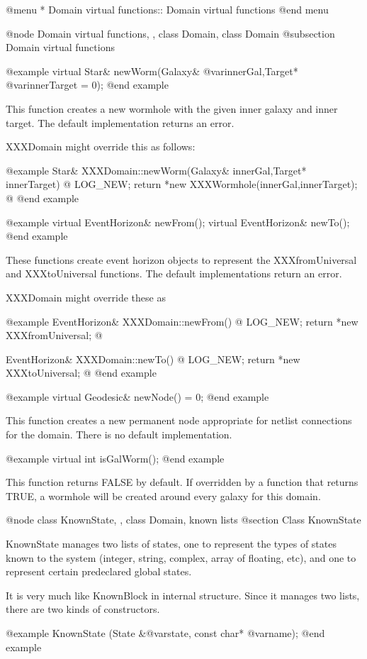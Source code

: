 @menu
* Domain virtual functions::    Domain virtual functions
@end menu

@node Domain virtual functions,  , class Domain, class Domain
@subsection Domain virtual functions

@example
virtual Star& newWorm(Galaxy& @var{innerGal},Target* @var{innerTarget} = 0);
@end example

This function creates a new wormhole with the given inner galaxy and
inner target.  The default implementation returns an error.

XXXDomain might override this as follows:

@example
Star& XXXDomain::newWorm(Galaxy& innerGal,Target* innerTarget)  @{
        LOG_NEW; return *new XXXWormhole(innerGal,innerTarget);
@}
@end example

@example
virtual EventHorizon& newFrom();
virtual EventHorizon& newTo();
@end example

These functions create event horizon objects to represent the
XXXfromUniversal and XXXtoUniversal functions.  The default
implementations return an error.

XXXDomain might override these as

@example
EventHorizon& XXXDomain::newFrom() @{
    LOG_NEW; return *new XXXfromUniversal;
@}

EventHorizon& XXXDomain::newTo() @{
    LOG_NEW; return *new XXXtoUniversal;
@}
@end example

@example
virtual Geodesic& newNode() = 0;
@end example

This function creates a new permanent node appropriate for netlist
connections for the domain.  There is no default implementation.

@example
virtual int isGalWorm();
@end example

This function returns FALSE by default.  If overridden by a function
that returns TRUE, a wormhole will be created around every galaxy
for this domain.

@node class KnownState,  , class Domain, known lists
@section Class KnownState

KnownState manages two lists of states, one to represent the types of
states known to the system (integer, string, complex, array of floating,
etc), and one to represent certain predeclared global states.

It is very much like KnownBlock in internal structure.  Since it manages
two lists, there are two kinds of constructors.

@example
KnownState (State &@var{state}, const char* @var{name});
@end example

